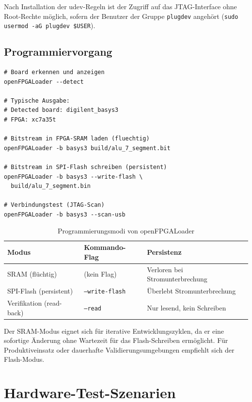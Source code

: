 ﻿\documentclass[12pt,a4paper]{report}
\begin{document}
Nach Installation der udev-Regeln ist der Zugriff auf das JTAG-Interface ohne Root-Rechte möglich, sofern der Benutzer der Gruppe \texttt{plugdev} angehört (\texttt{sudo usermod -aG plugdev \$USER}).

\subsection{Programmiervorgang}
\label{subsec:programmiervorgang}

\begin{lstlisting}[style=bashstyle, caption={FPGA-Programmierung mit openFPGALoader}]
# Board erkennen und anzeigen
openFPGALoader --detect

# Typische Ausgabe:
# Detected board: digilent_basys3
# FPGA: xc7a35t

# Bitstream in FPGA-SRAM laden (fluechtig)
openFPGALoader -b basys3 build/alu_7_segment.bit

# Bitstream in SPI-Flash schreiben (persistent)
openFPGALoader -b basys3 --write-flash \
  build/alu_7_segment.bin

# Verbindungstest (JTAG-Scan)
openFPGALoader -b basys3 --scan-usb
\end{lstlisting}

\begin{table}[H]
\centering
\begin{tabular}{|l|l|l|}
\hline
\textbf{Modus} & \textbf{Kommando-Flag} & \textbf{Persistenz} \\
\hline
SRAM (flüchtig) & (kein Flag) & Verloren bei Stromunterbrechung \\
SPI-Flash (persistent) & \texttt{--write-flash} & Überlebt Stromunterbrechung \\
Verifikation (read-back) & \texttt{--read} & Nur lesend, kein Schreiben \\
\hline
\end{tabular}
\caption{Programmierungsmodi von openFPGALoader}
\label{tab:openfpgaloader_modes}
\end{table}

Der SRAM-Modus eignet sich für iterative Entwicklungszyklen, da er eine sofortige Änderung ohne Wartezeit für das Flash-Schreiben ermöglicht. Für Produktiveinsatz oder dauerhafte Validierungsumgebungen empfiehlt sich der Flash-Modus.

\section{Hardware-Test-Szenarien}
\label{sec:hardware_tests}
\end{document}
